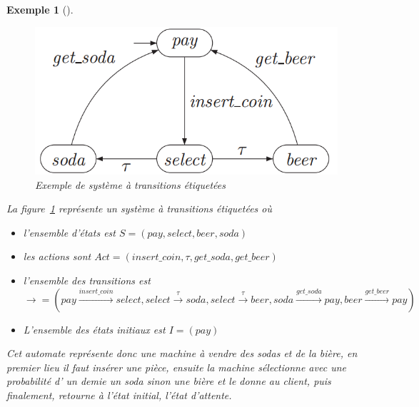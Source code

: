 \documentclass[a4paper]{report}
\theoremstyle{break}
\newtheorem{exem}{Exemple}
\theoremstyle{breakplain}
\begin{document}
\begin{exem}[\cite{baier2008principles}]
$\quad$
\begin{figure}[h]
\begin{center}
\includegraphics[scale=0.5]{images/exemplts.png}
\caption{Exemple de système à transitions étiquetées \cite{baier2008principles}}
\label{exemplts}
\end{center}
\end{figure}

La figure~\ref{exemplts} représente un système à transitions étiquetées où
\begin{itemize}
\item l'ensemble d'états est $S = (pay, select, beer, soda)$
\item les actions sont $Act = (insert\_coin, \tau, get\_soda, get\_beer)$
\item l'ensemble des transitions est $\rightarrow = (pay\xrightarrow{insert\_coin}{}select, select\xrightarrow{\tau}{}soda, select\xrightarrow{\tau}{}beer, soda\xrightarrow{get\_soda}{}pay, beer\xrightarrow{get\_beer}{}pay)$
\item L'ensemble des états initiaux est $I = (pay)$
\end{itemize}
Cet automate représente donc une machine à vendre des sodas et de la bière, en premier lieu il faut insérer une pièce, ensuite la machine sélectionne avec une probabilité d’ un demie un soda sinon une bière et le donne au client, puis finalement, retourne à l'état initial, l'état d'attente.


\end{exem}
\end{document}
